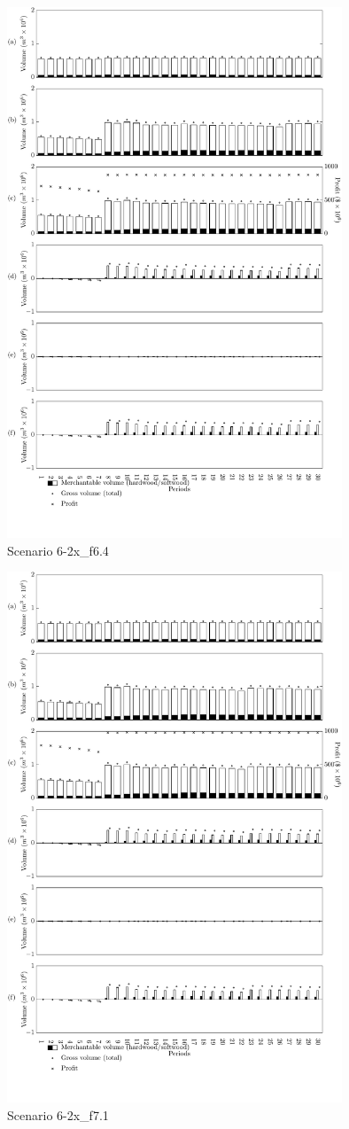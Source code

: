 \begin{figure}[h]
  \centering
  \includegraphics[width=10cm]{images/appendix/s6-2x_test90}
  \caption{Scenario 6-2x\_f6.4}
  \label{fig:s6-2x_test90}
\end{figure}

\begin{figure}[h]
  \centering
  \includegraphics[width=10cm]{images/appendix/s6-2x_test100}
  \caption{Scenario 6-2x\_f7.1}
  \label{fig:s6-2x_test100}
\end{figure}
